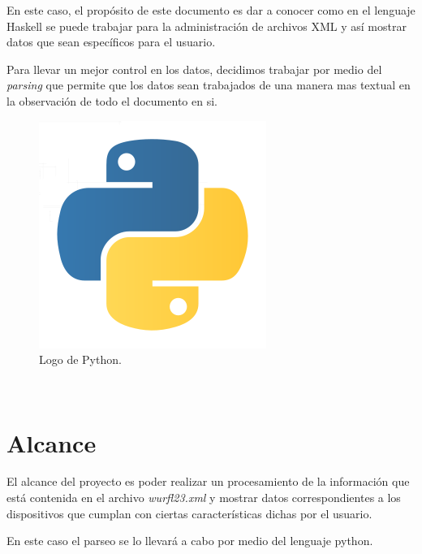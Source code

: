 \documentclass[12pt]{book} %
\begin{document}
En este caso, el prop\'osito de este documento es dar a conocer como en el lenguaje Haskell se puede trabajar para la administraci\'on de archivos XML y as\'i mostrar datos que sean espec\'ificos para el usuario. 

Para llevar un mejor control en los datos, decidimos trabajar por medio del \textit{parsing} que permite que los datos sean trabajados de una manera mas textual en la observaci\'on de todo el documento en si.

\begin{figure}[h!]
        \begin{center}
        \includegraphics[scale=0.5]{pylogo.png}
        \end{center}
        \caption{Logo de Python.}
\end{figure}~\\[2cm]



\chapter{Alcance}
El alcance del proyecto es poder realizar un procesamiento de la informaci\'on que est\'a contenida en el archivo \textit{wurfl23.xml} y mostrar datos correspondientes a los dispositivos que cumplan con ciertas caracter\'isticas dichas por el usuario.

En este caso el parseo se lo llevar\'a a cabo por medio del lenguaje python. 
\end{document}
